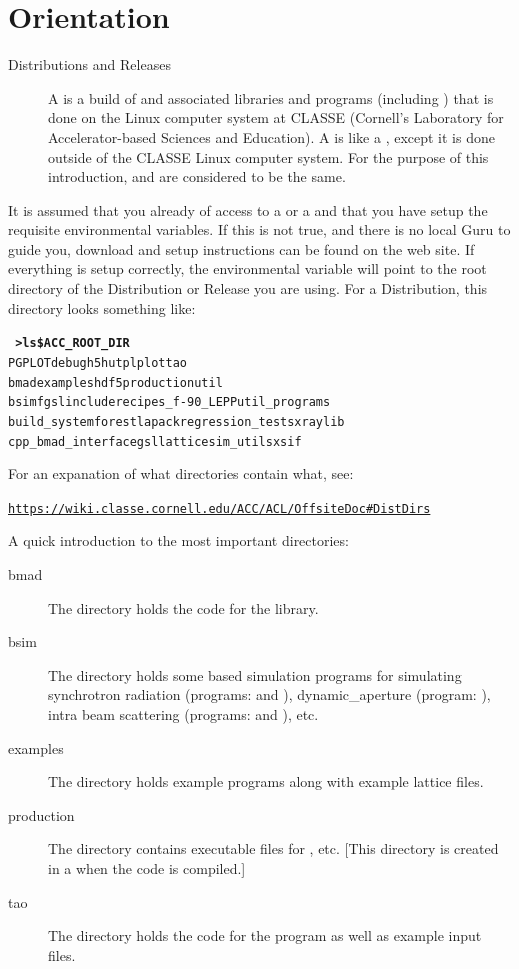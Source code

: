 \documentclass{hitec}
\newcommand{\BF}[1]{{\normalfont\textbf{#1}}}
\newcommand{\Section}[1]{\section{#1}\vspace*{-1ex}}
\newenvironment{display}
  {\vspace*{-1.5ex} \begin{alltt}}
  {\end{alltt} \vspace*{-1.0ex}}
\begin{document}
\Section{Orientation}

  \begin{description}
  \item[Distributions and Releases] \Newline
A  is a build of \bmad and associated libraries and programs (including \tao)
that is done on the Linux computer system at CLASSE (Cornell's Laboratory for
Accelerator-based Sciences and Education). A  is like a ,
except it is done outside of the CLASSE Linux computer system. For the purpose
of this introduction,  and  are considered to be the same.
  \end{description}

It is assumed that you already of access to a  or a  and that
you have setup the requisite environmental variables. If this is not true, and there is no
local Guru to guide you, download and setup instructions can be found on the \bmad web
site. If everything is setup correctly, the environmental variable  will
point to the root directory of the Distribution or Release you are using. For a
Distribution, this directory looks something like:
\begin{display}
  \BF{~> ls \$ACC_ROOT_DIR}
  PGPLOT                debug       h5hut        plplot                tao
  bmad                  examples    hdf5         production            util
  bsim                  fgsl        include      recipes_f-90_LEPP     util_programs
  build_system          forest      lapack       regression_tests      xraylib
  cpp_bmad_interface    gsl         lattice      sim_utils             xsif
\end{display}

For an expanation of what directories contain what, see:
\begin{display}
  \url{https://wiki.classe.cornell.edu/ACC/ACL/OffsiteDoc#DistDirs}
\end{display}

A quick introduction to the most important directories:
  \begin{description}
  \item[bmad] \Newline
The  directory holds the code for the \bmad library.
  \item[bsim] \Newline
The  directory holds some \bmad based simulation programs for simulating
synchrotron radiation (programs:  and ), dynamic_aperture
(program: ), intra beam scattering (programs:  and
), etc.
  \item[examples] \Newline
The  directory holds example programs along with example lattice files.
  \item[production] \Newline
The  directory contains executable files for \tao, etc. [This
directory is created in a  when the \bmad code is compiled.]
  \item[tao] \Newline
The  directory holds the code for the \tao program as well as example input
files.
  \end{description}
\end{document}
